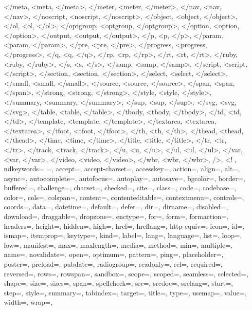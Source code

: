 {{            </meta, <meta, </meta>,
            </meter, <meter, </meter>,
            </nav, <nav, </nav>,
            </noscript, <noscript, </noscript>,
            </object, <object, </object>,
            </ol, <ol, </ol>,
            </optgroup, <optgroup, </optgroup>,
            </option, <option, </option>,
            </output, <output, </output>,
            </p, <p, </p>,
            </param, <param, </param>,
            </pre, <pre, </pre>,
            </progress, <progress, </progress>,
            </q, <q, </q>,
            </rp, <rp, </rp>,
            </rt, <rt, </rt>,
            </ruby, <ruby, </ruby>,
            </s, <s, </s>,
            </samp, <samp, </samp>,
            </script, <script, </script>,
            </section, <section, </section>,
            </select, <select, </select>,
            </small, <small, </small>,
            </source, <source, </source>,
            </span, <span, </span>,
            </strong, <strong, </strong>,
            </style, <style, </style>,
            </summary, <summary, </summary>,
            </sup, <sup, </sup>,
            </svg, <svg, </svg>,
            </table, <table, </table>,
            </tbody, <tbody, </tbody>,
            </td, <td, </td>,
            </template, <template, </template>,
            </textarea, <textarea, </textarea>,
            </tfoot, <tfoot, </tfoot>,
            </th, <th, </th>,
            </thead, <thead, </thead>,
            </time, <time, </time>,
            </title, <title, </title>,
            </tr, <tr, </tr>,
            </track, <track, </track>,
            </u, <u, </u>,
            </ul, <ul, </ul>,
            </var, <var, </var>,
            </video, <video, </video>,
            </wbr, <wbr, </wbr>,
            />, <!
            },  
            ndkeywords={
            =,
            accept=, accept-charset=, accesskey=, action=, align=, alt=, async=, autocomplete=, autofocus=, autoplay=, autosave=, bgcolor=, border=, buffered=, challenge=, charset=, checked=, cite=, class=, code=, codebase=, color=, cols=, colspan=, content=, contenteditable=, contextmenu=, controls=, coords=, data=, datetime=, default=, defer=, dir=, dirname=, disabled=, download=, draggable=, dropzone=, enctype=, for=, form=, formaction=, headers=, height=, hidden=, high=, href=, hreflang=, http-equiv=, icon=, id=, ismap=, itemprop=, keytype=, kind=, label=, lang=, language=, list=, loop=, low=, manifest=, max=, maxlength=, media=, method=, min=, multiple=, name=, novalidate=, open=, optimum=, pattern=, ping=, placeholder=, poster=, preload=, pubdate=, radiogroup=, readonly=, rel=, required=, reversed=, rows=, rowspan=, sandbox=, scope=, scoped=, seamless=, selected=, shape=, size=, sizes=, span=, spellcheck=, src=, srcdoc=, srclang=, start=, step=, style=, summary=, tabindex=, target=, title=, type=, usemap=, value=, width=, wrap=,
}}
